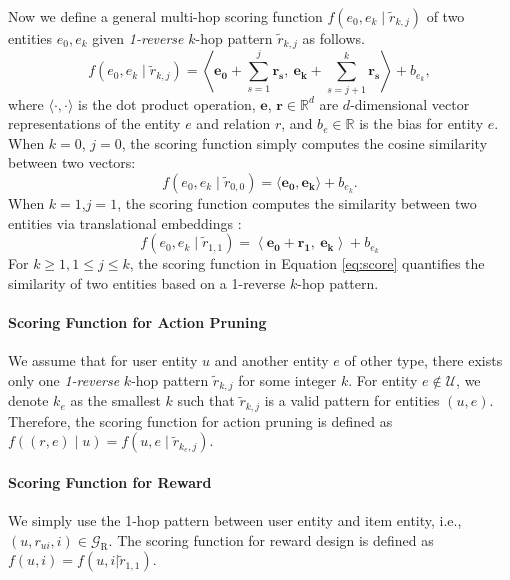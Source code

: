 \documentclass[sigconf]{acmart}
\begin{document}
Now we define a general multi-hop scoring function $f(e_0,e_k \mid \tilde{r}_{k,j})$ of two entities $e_0,e_k$ given \emph{1-reverse} $k$-hop pattern $\widetilde{r}_{k,j}$ as follows.
\begin{equation}\label{eq:score}
f(e_0,e_k \mid \widetilde{r}_{k,j}) = \left\langle\mathbf{e_0}+\sum_{s=1}^{j}\mathbf{r_s},~\mathbf{e_k}+\sum_{s=j+1}^{k}\mathbf{r_s}\right\rangle+b_{e_k},
\end{equation}
where $\langle\cdot,\cdot\rangle$ is the dot product operation, $\mathbf{e}$, $\mathbf{r}\in\mathds{R}^d$ are $d$-dimensional vector representations of the entity $e$ and relation $r$, and $b_{e}\in\mathds{R}$ is the bias for entity $e$.
When $k=0$, $j=0$, the scoring function simply computes the cosine similarity between two vectors:
\begin{equation}
f(e_0,e_k \mid \tilde{r}_{0,0})=\langle\mathbf{e_0},\mathbf{e_k}\rangle+b_{e_k}.
\end{equation}
When $k=1$,$j=1$, the scoring function computes the similarity between two entities via translational embeddings \cite{bordes2013translating}:
\begin{equation}\label{eq:transe}
f(e_0,e_k \mid \widetilde{r}_{1,1}) = \left\langle\mathbf{e_0}+\mathbf{r_1},~\mathbf{e_k}\right\rangle+b_{e_k}
\end{equation}
For $k\ge1,1\le j\le k$, the scoring function in Equation \ref{eq:score} quantifies the similarity of two entities based on a 1-reverse $k$-hop pattern.

\paragraph{Scoring Function for Action Pruning}
We assume that for user entity $u$ and another entity $e$ of other type, there exists only one \emph{1-reverse} $k$-hop pattern $\tilde{r}_{k,j}$ for some integer $k$.
For entity $e\not\in\mathcal{U}$, we denote $k_e$ as the smallest $k$ such that $\tilde{r}_{k,j}$ is a valid pattern for entities $(u,e)$.
Therefore, the scoring function for action pruning is defined as $f((r,e)\mid u)=f(u,e \mid \tilde{r}_{k_e,j})$.

\paragraph{Scoring Function for Reward}
We simply use the 1-hop pattern between user entity and item entity, i.e., $(u,r_{ui},i)\in\mathcal{G}_\text{R}$.
The scoring function for reward design is defined as $f(u,i)=f(u,i|\tilde{r}_{1,1})$.
\end{document}
